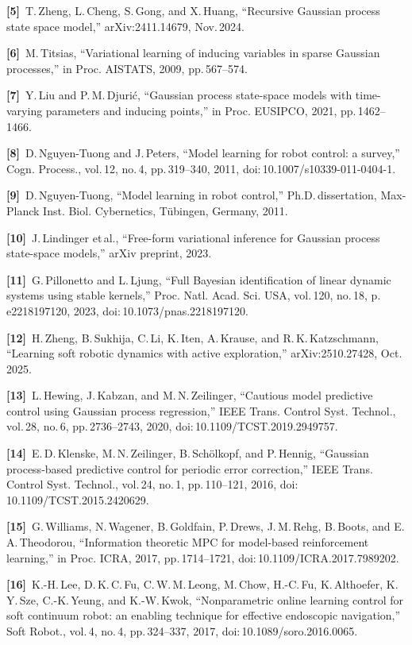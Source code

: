 \documentclass[letterpaper, 10pt, journal, twoside]{IEEEtran}
\begin{document}
\textbf{{[}5{]} }T.\,Zheng, L.\,Cheng, S.\,Gong, and X.\,Huang,
``Recursive Gaussian process state space model,'' arXiv:2411.14679,
Nov.\,2024.

\textbf{{[}6{]} }M.\,Titsias, ``Variational learning of inducing
variables in sparse Gaussian processes,'' in Proc. AISTATS, 2009,
pp.\,567--574.

\textbf{{[}7{]} }Y.\,Liu and P.\,M.\,Djurić, ``Gaussian process
state-space models with time-varying parameters and inducing points,''
in Proc. EUSIPCO, 2021, pp.\,1462--1466.

\textbf{{[}8{]} }D.\,Nguyen-Tuong and J.\,Peters, ``Model learning for
robot control: a survey,'' Cogn. Process., vol.\,12, no.\,4,
pp.\,319--340, 2011, doi:\,10.1007/s10339-011-0404-1.

\textbf{{[}9{]} }D.\,Nguyen-Tuong, ``Model learning in robot control,''
Ph.D.\,dissertation, Max-Planck Inst. Biol. Cybernetics, Tübingen,
Germany, 2011.

\textbf{{[}10{]} }J.\,Lindinger et\,al., ``Free-form variational
inference for Gaussian process state-space models,'' arXiv preprint,
2023.

\textbf{{[}11{]} }G.\,Pillonetto and L.\,Ljung, ``Full Bayesian
identification of linear dynamic systems using stable kernels,'' Proc.
Natl. Acad. Sci. USA, vol.\,120, no.\,18, p.\,e2218197120, 2023,
doi:\,10.1073/pnas.2218197120.

\textbf{{[}12{]} }H.\,Zheng, B.\,Sukhija, C.\,Li, K.\,Iten, A.\,Krause,
and R.\,K.\,Katzschmann, ``Learning soft robotic dynamics with active
exploration,'' arXiv:2510.27428, Oct.\,2025.

\textbf{{[}13{]} }L.\,Hewing, J.\,Kabzan, and M.\,N.\,Zeilinger,
``Cautious model predictive control using Gaussian process regression,''
IEEE Trans. Control Syst. Technol., vol.\,28, no.\,6, pp.\,2736--2743,
2020, doi:\,10.1109/TCST.2019.2949757.

\textbf{{[}14{]} }E.\,D.\,Klenske, M.\,N.\,Zeilinger, B.\,Schölkopf, and
P.\,Hennig, ``Gaussian process-based predictive control for periodic
error correction,'' IEEE Trans. Control Syst. Technol., vol.\,24,
no.\,1, pp.\,110--121, 2016, doi:\,10.1109/TCST.2015.2420629.

\textbf{{[}15{]} }G.\,Williams, N.\,Wagener, B.\,Goldfain, P.\,Drews,
J.\,M.\,Rehg, B.\,Boots, and E.\,A.\,Theodorou, ``Information theoretic
MPC for model-based reinforcement learning,'' in Proc. ICRA, 2017,
pp.\,1714--1721, doi:\,10.1109/ICRA.2017.7989202.

\textbf{{[}16{]} }K.-H.\,Lee, D.\,K.\,C.\,Fu, C.\,W.\,M.\,Leong,
M.\,Chow, H.-C.\,Fu, K.\,Althoefer, K.\,Y.\,Sze, C.-K.\,Yeung, and
K.-W.\,Kwok, ``Nonparametric online learning control for soft continuum
robot: an enabling technique for effective endoscopic navigation,'' Soft
Robot., vol.\,4, no.\,4, pp.\,324--337, 2017,
doi:\,10.1089/soro.2016.0065.
\end{document}
